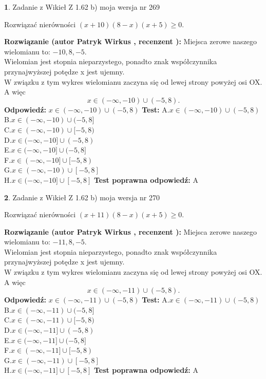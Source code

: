 \documentclass[12pt, a4paper]{article}
\theoremstyle{definition} %
\newtheorem{zad}{}
\newcommand{\zadStart}[1]{\begin{zad}#1\newline}
\newcommand{\zadStop}{\end{zad}}
\newcommand{\rozwStart}[2]{\noindent \textbf{Rozwiązanie (autor #1 , recenzent #2): }\newline}
\newcommand{\rozwStop}{\newline}
\newcommand{\odpStart}{\noindent \textbf{Odpowiedź:}\newline}
\newcommand{\odpStop}{\newline}
\newcommand{\testStart}{\noindent \textbf{Test:}\newline}
\newcommand{\testStop}{\newline}
\newcommand{\kluczStart}{\noindent \textbf{Test poprawna odpowiedź:}\newline}
\newcommand{\kluczStop}{\newline}
\begin{document}
\zadStart{Zadanie z Wikieł Z 1.62 b) moja wersja nr 269}

Rozwiązać nierówności $(x+10)(8-x)(x+5)\ge0$.
\zadStop
\rozwStart{Patryk Wirkus}{}
Miejsca zerowe naszego wielomianu to: $-10, 8, -5$.\\
Wielomian jest stopnia nieparzystego, ponadto znak współczynnika przy\linebreak najwyższej potędze x jest ujemny.\\ W związku z tym wykres wielomianu zaczyna się od lewej strony powyżej osi OX. A więc $$x \in (-\infty,-10) \cup (-5,8).$$
\rozwStop
\odpStart
$x \in (-\infty,-10) \cup (-5,8)$
\odpStop
\testStart
A.$x \in (-\infty,-10) \cup (-5,8)$\\
B.$x \in (-\infty,-10) \cup (-5,8]$\\
C.$x \in (-\infty,-10) \cup [-5,8)$\\
D.$x \in (-\infty,-10] \cup (-5,8)$\\
E.$x \in (-\infty,-10] \cup (-5,8]$\\
F.$x \in (-\infty,-10] \cup [-5,8)$\\
G.$x \in (-\infty,-10) \cup [-5,8]$\\
H.$x \in (-\infty,-10] \cup [-5,8]$
\testStop
\kluczStart
A
\kluczStop



\zadStart{Zadanie z Wikieł Z 1.62 b) moja wersja nr 270}

Rozwiązać nierówności $(x+11)(8-x)(x+5)\ge0$.
\zadStop
\rozwStart{Patryk Wirkus}{}
Miejsca zerowe naszego wielomianu to: $-11, 8, -5$.\\
Wielomian jest stopnia nieparzystego, ponadto znak współczynnika przy\linebreak najwyższej potędze x jest ujemny.\\ W związku z tym wykres wielomianu zaczyna się od lewej strony powyżej osi OX. A więc $$x \in (-\infty,-11) \cup (-5,8).$$
\rozwStop
\odpStart
$x \in (-\infty,-11) \cup (-5,8)$
\odpStop
\testStart
A.$x \in (-\infty,-11) \cup (-5,8)$\\
B.$x \in (-\infty,-11) \cup (-5,8]$\\
C.$x \in (-\infty,-11) \cup [-5,8)$\\
D.$x \in (-\infty,-11] \cup (-5,8)$\\
E.$x \in (-\infty,-11] \cup (-5,8]$\\
F.$x \in (-\infty,-11] \cup [-5,8)$\\
G.$x \in (-\infty,-11) \cup [-5,8]$\\
H.$x \in (-\infty,-11] \cup [-5,8]$
\testStop
\kluczStart
A
\kluczStop
\end{document}
